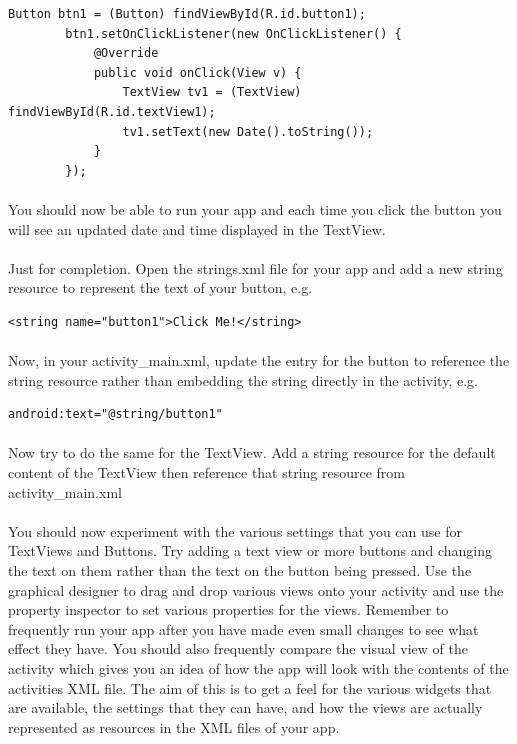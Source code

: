 \documentclass[12pt, a4paper, twoside]{book}
\begin{document}
\begin{lstlisting}
Button btn1 = (Button) findViewById(R.id.button1);
        btn1.setOnClickListener(new OnClickListener() {
            @Override
            public void onClick(View v) {
                TextView tv1 = (TextView) findViewById(R.id.textView1);
                tv1.setText(new Date().toString());
            }
        });
\end{lstlisting}

\paragraph{} You should now be able to run your app and each time you click the button you will see an updated date and time displayed in the TextView.

\paragraph{} Just for completion. Open the strings.xml file for your app and add a new string resource to represent the text of your button, e.g.

\begin{lstlisting}
<string name="button1">Click Me!</string>
\end{lstlisting}

\paragraph{} Now, in your activity\_main.xml, update the entry for the button to reference the string resource rather than embedding the string directly in the activity, e.g.

\begin{lstlisting}
android:text="@string/button1"
\end{lstlisting}

\paragraph{} Now try to do the same for the TextView. Add a string resource for the default content of the TextView then reference that string resource from activity\_main.xml

\paragraph{} You should now experiment with the various settings that you can use for TextViews and Buttons. Try adding a text view or more buttons and changing the text on them rather than the text on the button being pressed. Use the graphical designer to drag and drop various views onto your activity and use the property inspector to set various properties for the views. Remember to frequently run your app after you have made even small changes to see what effect they have. You should also frequently compare the visual view of the activity which gives you an idea of how the app will look with the contents of the activities XML file. The aim of this is to get a feel for the various widgets that are available, the settings that they can have, and how the views are actually represented as resources in the XML files of your app.
\end{document}
